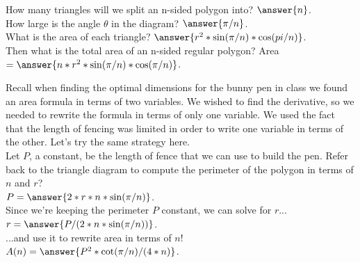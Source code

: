 \documentclass[handout,nooutcomes]{ximera}
\begin{document}
    
    

\hspace{2cm}How many triangles will we split an n-sided polygon into? $\answer{n}$.\\
How large is the angle $\theta$ in the diagram? $\answer{\pi/n}$.\\
What is the area of each triangle? $\answer{r^2*\sin(\pi/n)*\cos(pi/n)}$.\\
Then what is the total area of an n-sided regular polygon? Area $=\answer{n*r^2*\sin(\pi/n)*\cos(\pi/n)}$.\\

\bigskip

\hspace{2cm}Recall when finding the optimal dimensions for the bunny pen in class we found an area formula in terms of two variables. We wished to find the derivative, so we needed to rewrite the formula in terms of only one variable. We used the fact that the length of fencing was limited in order to write one variable in terms of the other. Let's try the same strategy here.\\
Let $P$, a constant, be the length of fence that we can use to build the pen. Refer back to the triangle diagram to compute the perimeter of the polygon in terms of $n$ and $r$?\\
$P = \answer{2*r*n*\sin(\pi/n)}$.\\
Since we're keeping the perimeter $P$ constant, we can solve for $r$...\\
$r = \answer{P/(2*n*\sin(\pi/n))}$.\\
...and use it to rewrite area in terms of $n$!\\
$A(n) = \answer{P^2*\cot(\pi/n)/(4*n)}$.\\

\bigskip
\end{document}

